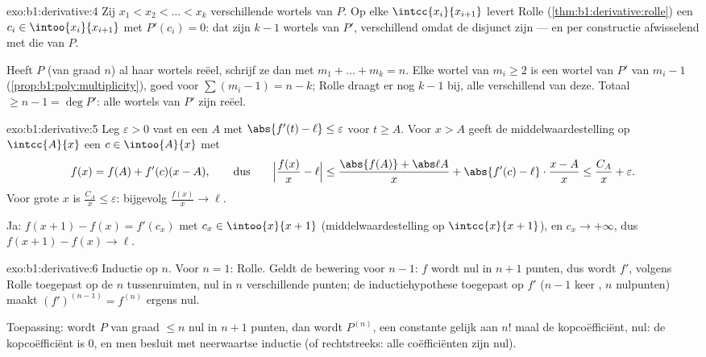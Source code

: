 \begin{solution}{exo:b1:derivative:4}
Zij $x_1 < x_2 < \dots < x_k$ verschillende wortels van $P$. Op elke
$\intcc{x_i}{x_{i+1}}$ levert Rolle
(\cref{thm:b1:derivative:rolle}) een $c_i \in \intoo{x_i}{x_{i+1}}$
met $P'(c_i) = 0$: dat zijn $k - 1$ wortels van $P'$, verschillend
omdat de   disjunct zijn --- en per constructie
afwisselend met die van $P$.

Heeft $P$ (van graad $n$) al haar wortels reëel, schrijf ze dan met
 $m_1 + \dots + m_k = n$. Elke wortel van
 $m_i \geq 2$ is een wortel van $P'$ van
 $m_i - 1$ (\cref{prop:b1:poly:multiplicity}), goed
voor $\sum (m_i - 1) = n - k$; Rolle draagt er nog $k - 1$ bij, alle
verschillend van deze. Totaal $\geq n - 1 = \deg P'$: alle wortels
van $P'$ zijn reëel.
\end{solution}

\begin{solution}{exo:b1:derivative:5}
Leg $\varepsilon > 0$ vast en een $A$ met $\abs{f'(t) - \ell} \leq
\varepsilon$ voor $t \geq A$. Voor $x > A$ geeft de
middelwaardestelling op $\intcc{A}{x}$ een $c \in \intoo{A}{x}$ met
\[
f(x) = f(A) + f'(c)(x - A),
\qquad\text{dus}\qquad
\Bigl|\frac{f(x)}{x} - \ell\Bigr|
\leq \frac{\abs{f(A)} + \abs\ell A}{x} + \abs{f'(c) - \ell}
\cdot\frac{x - A}{x} \leq \frac{C_A}{x} + \varepsilon .
\]
Voor grote $x$ is $\frac{C_A}{x} \leq \varepsilon$: bijgevolg
$\frac{f(x)}{x} \to \ell$.

Ja: $f(x+1) - f(x) = f'(c_x)$ met $c_x \in \intoo{x}{x+1}$
(middelwaardestelling op $\intcc{x}{x+1}$), en $c_x \to +\infty$,
dus $f(x+1) - f(x) \to \ell$.
\end{solution}

\begin{solution}{exo:b1:derivative:6}
Inductie op $n$. Voor $n = 1$: Rolle. Geldt de bewering voor $n - 1$:
$f$ wordt nul in $n+1$ punten, dus wordt $f'$, volgens Rolle
toegepast op de $n$ tussenruimten, nul in $n$ verschillende punten;
de inductiehypothese toegepast op $f'$ ($n-1$ keer , $n$
nulpunten) maakt $(f')^{(n-1)} = f^{(n)}$ ergens nul.

Toepassing: wordt $P$ van graad $\leq n$ nul in $n+1$ punten, dan
wordt $P^{(n)}$, een constante gelijk aan $n!$ maal de kopcoëfficiënt,
nul: de kopcoëfficiënt is $0$, en men besluit met neerwaartse
inductie (of rechtstreeks: alle coëfficiënten zijn nul).
\end{solution}

